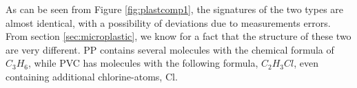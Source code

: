 \noindent
As can be seen from Figure \ref{fig:plastcomp1}, the signatures of the two types are almost identical, with a possibility of deviations due to measurements errors. From section \ref{sec:microplastic}, we know for a fact that the structure of these two are very different. PP contains several molecules with the chemical formula of $C_3H_6$, while PVC has molecules with the following formula, $C_2H_3Cl$, even containing additional chlorine-atoms, Cl.  
\\\\
